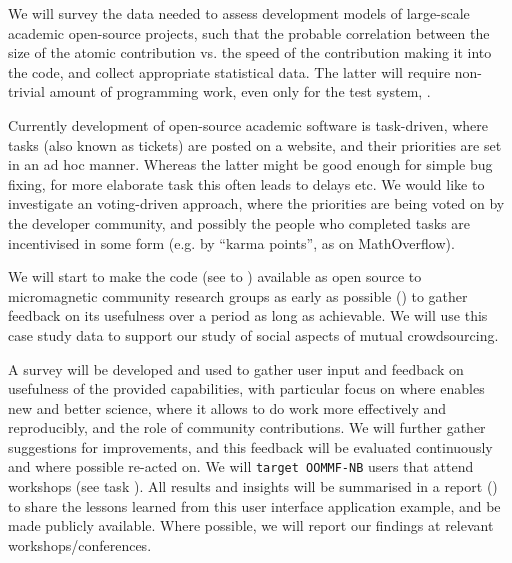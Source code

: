 \begin{workpackage}[id=social-aspects,wphases=1-48!.5,
  title=Social Aspects,
  lead=UO,
  UORM=1,USHRM=8, USORM=5]
\begin{tasklist}
\begin{task}[title=Survey and collection of needed data,id=datacollection]
We will survey the data needed to assess development models of
large-scale academic open-source projects,
such that the probable correlation between the size of the atomic contribution
vs. the speed of the contribution making it into the code,
and collect appropriate statistical data. The latter will require non-trivial
amount of programming work, even only for the test system, \Sage.
\end{task}

\begin{task}[title=Collective decision making in development,id=decisionmaking]
Currently development of open-source academic software is task-driven, where tasks (also
known as tickets) are posted on a website, and their priorities are set in an ad hoc manner.
Whereas the latter might be good enough for simple bug fixing, for more elaborate task this
often leads to delays etc.
We would like to investigate an voting-driven approach, where the priorities are being
voted on by the developer community, and possibly the people who completed tasks
are incentivised in some form (e.g. by ``karma points'', as on MathOverflow).
\end{task}

\begin{task}[title=OOMMF case study: Evaluation]
  We will start to make the \OOMMFNB{} code (see
   to
  ) available as open
  source to micromagnetic community research groups as early as
  possible
  () to
  gather feedback on its usefulness over a period as long as
  achievable. We will use this case study data to support our study of
  social aspects of mutual crowdsourcing.

  A survey will be developed and used to gather user input and
  feedback on usefulness of the provided capabilities, with particular
  focus on where \OOMMFNB{} enables new and better science, where it
  allows to do work more effectively and reproducibly, and the role of
  community contributions. We will further gather suggestions for
  improvements, and this feedback will be evaluated continuously and
  where possible re-acted on. We will \texttt{target OOMMF-NB} users
  that attend workshops (see task
  ). All results
  and insights will be summarised in a report () to share the lessons
  learned from this user interface application example, and be made
  publicly available. Where possible, we will report our findings at
  relevant workshops/conferences.
\end{task}




\end{tasklist}
\end{workpackage}
